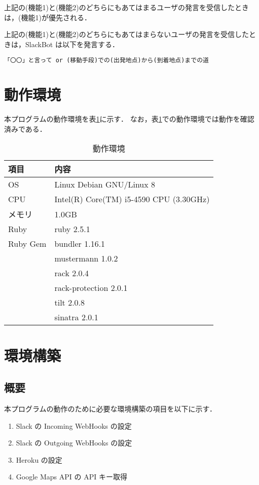 \documentclass[12pt]{jsarticle}
\begin{document}
上記の(機能1)と(機能2)のどちらにもあてはまるユーザの発言を受信したときは，(機能1)が優先される．

上記の(機能1)と(機能2)のどちらにもあてはまらないユーザの発言を受信したときは，SlackBot は以下を発言する．
\begin{verbatim}
「〇〇」と言って or (移動手段)での(出発地点)から(到着地点)までの道
\end{verbatim}
\section{動作環境}
本プログラムの動作環境を表\ref{tab:env}に示す．
なお，表\ref{tab:env}での動作環境では動作を確認済みである．
\begin{table}[tb]
  \begin{center}
    \caption{動作環境}\label{tab:env}
    \begin{tabular}{l|l}
      \hline\hline
      \multicolumn{1}{l|}{項目} & \multicolumn{1}{l}{内容} \\
      \hline
      OS       & Linux Debian GNU/Linux 8 \\
      CPU      & Intel(R) Core(TM) i5-4590 CPU (3.30GHz) \\
      メモリ   & 1.0GB \\
      Ruby     & ruby 2.5.1 \\
      Ruby Gem & bundler 1.16.1\\
               & mustermann 1.0.2 \\
               & rack 2.0.4 \\
               & rack-protection 2.0.1 \\
               & tilt 2.0.8 \\
               & sinatra 2.0.1 \\
      \hline
    \end{tabular}
  \end{center}
\end{table}

\section{環境構築}
\subsection{概要}
本プログラムの動作のために必要な環境構築の項目を以下に示す．
\begin{enumerate}
\item Slack の Incoming WebHooks の設定
\item Slack の Outgoing WebHooks の設定
\item Heroku の設定
\item Google Maps API の API キー取得
\end{enumerate}
\end{document}
